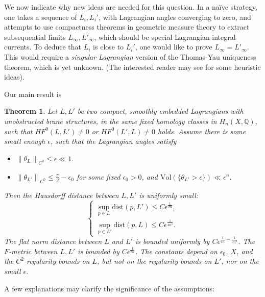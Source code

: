 \documentclass[a4paper]{article}
\newtheorem{thm}{Theorem}[section]
\theoremstyle{definition}
\newcommand{\Q}{\mathbb{Q}}
\newcommand{\norm}[1]{\left\lVert#1\right\rVert}
\begin{document}
We now indicate why new ideas are needed for this question. In a na\"ive strategy, one takes a sequence of $L_i, L_i'$, with Lagrangian angles converging to zero, and attempts to use compactness theorems in geometric measure theory to extract subsequential limits $L_\infty,L'_\infty$, which should be special Lagrangian integral currents. To deduce that $L_i$ is close to $L_i'$, one would like to prove $L_\infty=L'_\infty$. This would require a \emph{singular Lagrangian} version of the Thomas-Yau uniqueness theorem, which is yet unknown. (The interested reader may see \cite[section 5.7]{Li} for some heuristic ideas). 









Our main result is
\begin{thm}\label{main}
Let $L,L'$ be two compact, smoothly embedded Lagrangians with unobstructed brane structures, in the same fixed homology classes in $H_n(X,\Q)$, such that $HF^0(L,L')\neq 0$ or $HF^0(L',L)\neq 0$ holds. Assume there is some small enough $\epsilon$, such that the Lagrangian angles satisfy
\begin{itemize}
\item $\norm{\theta_L}_{C^0} \leq \epsilon\ll 1.$
\item $\norm{\theta_{L'}}_{C^0}\leq \frac{\pi}{2}-\epsilon_0$ for some fixed $\epsilon_0>0$, and $\text{Vol}(\{ \theta_{L'}>\epsilon \})\ll \epsilon^n$.
\end{itemize}
Then the Hausdorff distance between $L, L'$ is uniformly small:
\begin{equation}
\begin{cases}
\sup_{p\in L} \text{dist}(p,L') \leq C\epsilon^{\frac{1}{2n}},
\\
\sup_{p\in L'} \text{dist}(p,L)\leq C\epsilon^{ \frac{1}{4n^2}  }.
\end{cases}
\end{equation}
The flat norm distance between $L$ and $L'$ is bounded uniformly by $C\epsilon^{ \frac{1}{4n}+ \frac{1}{4n^2}  }$. The $F$-metric between $L,L'$ is bounded by $C\epsilon^{ \frac{1}{8n}  }$. 
The constants depend on $\epsilon_0$, $X$, and the $C^2$-regularity bounds on $L$, but not on the regularity bounds on $L'$, nor on the small $\epsilon$. 
\end{thm}




A few explanations may clarify the significance of the assumptions:
\end{document}
